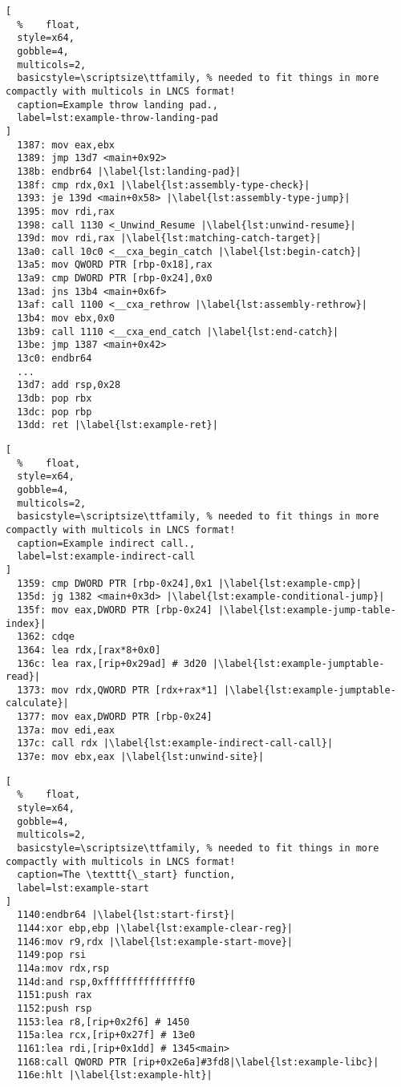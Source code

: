 \begin{lstlisting}[
  %    float,
  style=x64,
  gobble=4,
  multicols=2,
  basicstyle=\scriptsize\ttfamily, % needed to fit things in more compactly with multicols in LNCS format!
  caption=Example throw landing pad.,
  label=lst:example-throw-landing-pad
]
  1387: mov eax,ebx
  1389: jmp 13d7 <main+0x92>
  138b: endbr64 |\label{lst:landing-pad}|
  138f: cmp rdx,0x1 |\label{lst:assembly-type-check}|
  1393: je 139d <main+0x58> |\label{lst:assembly-type-jump}|
  1395: mov rdi,rax
  1398: call 1130 <_Unwind_Resume |\label{lst:unwind-resume}|
  139d: mov rdi,rax |\label{lst:matching-catch-target}|
  13a0: call 10c0 <__cxa_begin_catch |\label{lst:begin-catch}|
  13a5: mov QWORD PTR [rbp-0x18],rax
  13a9: cmp DWORD PTR [rbp-0x24],0x0
  13ad: jns 13b4 <main+0x6f>
  13af: call 1100 <__cxa_rethrow |\label{lst:assembly-rethrow}|
  13b4: mov ebx,0x0
  13b9: call 1110 <__cxa_end_catch |\label{lst:end-catch}|
  13be: jmp 1387 <main+0x42>
  13c0: endbr64
  ...
  13d7: add rsp,0x28
  13db: pop rbx
  13dc: pop rbp
  13dd: ret |\label{lst:example-ret}|
\end{lstlisting}
\begin{lstlisting}[
  %    float,
  style=x64,
  gobble=4,
  multicols=2,
  basicstyle=\scriptsize\ttfamily, % needed to fit things in more compactly with multicols in LNCS format!
  caption=Example indirect call.,
  label=lst:example-indirect-call
]
  1359: cmp DWORD PTR [rbp-0x24],0x1 |\label{lst:example-cmp}|
  135d: jg 1382 <main+0x3d> |\label{lst:example-conditional-jump}|
  135f: mov eax,DWORD PTR [rbp-0x24] |\label{lst:example-jump-table-index}|
  1362: cdqe
  1364: lea rdx,[rax*8+0x0]
  136c: lea rax,[rip+0x29ad] # 3d20 |\label{lst:example-jumptable-read}|
  1373: mov rdx,QWORD PTR [rdx+rax*1] |\label{lst:example-jumptable-calculate}|
  1377: mov eax,DWORD PTR [rbp-0x24]
  137a: mov edi,eax
  137c: call rdx |\label{lst:example-indirect-call-call}|
  137e: mov ebx,eax |\label{lst:unwind-site}|
\end{lstlisting}
\begin{lstlisting}[
  %    float,
  style=x64,
  gobble=4,
  multicols=2,
  basicstyle=\scriptsize\ttfamily, % needed to fit things in more compactly with multicols in LNCS format!
  caption=The \texttt{\_start} function,
  label=lst:example-start
]
  1140:endbr64 |\label{lst:start-first}|
  1144:xor ebp,ebp |\label{lst:example-clear-reg}|
  1146:mov r9,rdx |\label{lst:example-start-move}|
  1149:pop rsi
  114a:mov rdx,rsp
  114d:and rsp,0xfffffffffffffff0
  1151:push rax
  1152:push rsp
  1153:lea r8,[rip+0x2f6] # 1450
  115a:lea rcx,[rip+0x27f] # 13e0
  1161:lea rdi,[rip+0x1dd] # 1345<main>
  1168:call QWORD PTR [rip+0x2e6a]#3fd8|\label{lst:example-libc}|
  116e:hlt |\label{lst:example-hlt}|
\end{lstlisting}

